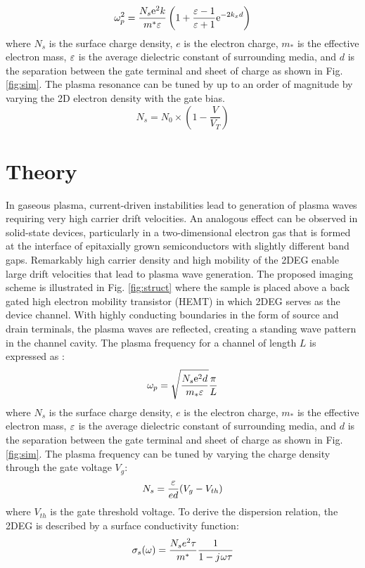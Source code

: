 \documentclass[11pt]{article}
\begin{document}
%
\begin{equation}
  \omega_p^2 = \frac{N_s \mathrm{e}^2 k}{m^{\ast}\varepsilon}\left(1 + \frac{\varepsilon - 1}{\varepsilon + 1}\mathrm{e}^{-2k_x d}\right)
  \label{eq:plasma_f_HEMT}
\end{equation}
%
where $N_s$ is the surface charge density, $e$ is the electron charge, $m_{\ast}$ is the effective electron mass, $\varepsilon$ is the average dielectric constant of surrounding media, and $d$ is the separation between the gate terminal and sheet of charge as shown in Fig. \ref{fig:sim}.
The plasma resonance can be tuned by up to an order of magnitude by varying the 2D electron density with the gate bias.
%
\begin{equation}
  N_s = N_0 \times(1 - \frac{V}{V_T})
  \label{eq:tunability}
\end{equation}
%
\section{Theory}
%
In gaseous plasma, current-driven instabilities lead to generation of plasma waves requiring very high carrier drift velocities. An analogous effect can be observed in solid-state devices, particularly in a two-dimensional electron gas that is formed at the interface of epitaxially grown semiconductors with slightly different band gaps. Remarkably high carrier density and high mobility of the 2DEG enable large drift velocities that lead to plasma wave generation.
The proposed imaging scheme is illustrated in Fig. \ref{fig:struct} where the sample is placed above a back gated high electron mobility transistor (HEMT) in which 2DEG serves as the device channel. With highly conducting boundaries in the form of source and drain terminals, the plasma waves are reflected, creating a standing wave pattern in the channel cavity. The plasma frequency for a channel of length $L$ is expressed as \cite{Popov2008}:
%
\begin{equation}
  \omega_p = \sqrt{\frac{N_s \mathrm{e}^2 d}{m_{\ast} \varepsilon}} \frac{\pi}{L}
\end{equation}
%
where $N_s$ is the surface charge density, $e$ is the electron charge, $m_{\ast}$ is the effective electron mass, $\varepsilon$ is the average dielectric constant of surrounding media, and $d$ is the separation between the gate terminal and sheet of charge as shown in Fig. \ref{fig:sim}. The plasma frequency can be tuned by varying the charge density through the gate voltage $V_g$:
%
\begin{equation}
  N_s = \frac{\varepsilon}{e d}(V_g - V_{th})
  \label{eq:tunability}
\end{equation}
%
where $V_{th}$ is the gate threshold voltage. To derive the dispersion relation, the 2DEG is described by a surface conductivity function:
%
\begin{equation}
  \sigma_s(\omega) = \frac{N_s e^2 \tau}{m^{\ast}}\frac{1}{1 - j\mkern1mu \omega \tau}
  \label{eq:conductivity}
\end{equation}
%
\end{document}

